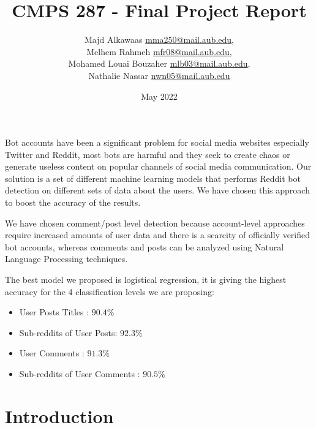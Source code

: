 \documentclass{article}
\title{CMPS 287 - Final Project Report}
\author{
Majd Alkawaas \hspace*{5mm} \href{mailto:mma250@mail.aub.edu}{mma250@mail.aub.edu},\\Melhem Rahmeh  \hspace*{5mm} \href{mailto:mfr08@mail.aub.edu}{mfr08@mail.aub.edu},\\ 
Mohamed Louai Bouzaher \hspace*{5mm} \href{mailto:mlb03@mail.aub.edu}{mlb03@mail.aub.edu},\\ 
Nathalie Nassar \hspace*{5mm} \href{mailto:nwn05@mail.aub.edu}{nwn05@mail.aub.edu}
}
\date{May 2022}
\begin{document}
\maketitle

Bot accounts have been a significant problem for social media websites especially Twitter and Reddit, most bots are harmful and they seek to create chaos or generate useless content on popular channels of social media communication. Our solution is a set of different machine learning models that performs Reddit bot detection on different sets of data about the users. We have chosen this approach to boost the accuracy of the results. \par

We have chosen comment/post level detection because account-level approaches require increased amounts of user data and there is a scarcity of officially verified bot accounts, whereas comments and posts can be analyzed using Natural Language Processing techniques.\par

The best model we proposed is logistical regression, it is giving the highest accuracy for the 4 classification levels we are proposing: \\
\begin{itemize}
\item User Posts Titles : $90.4\%$
\item Sub-reddits of User Posts: $92.3\%$
\item User Comments : $91.3\%$
\item Sub-reddits of User Comments : $90.5\%$


\end{itemize}

\section{Introduction}
\end{document}
